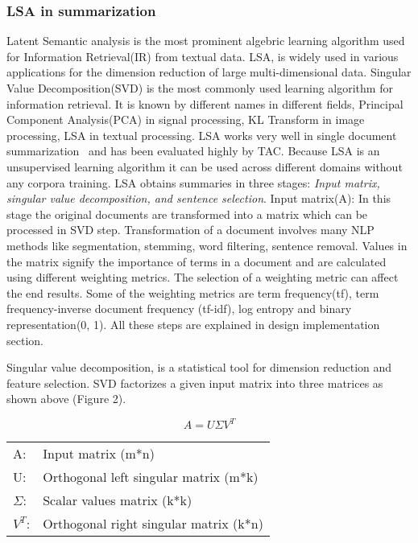 \subsubsection{LSA in summarization}
Latent Semantic analysis is the most prominent algebric learning algorithm used for Information Retrieval(IR) from textual data. LSA, is widely used
in various applications for the dimension reduction of large multi-dimensional data. Singular Value Decomposition(SVD) is the most
commonly used learning algorithm for information retrieval. It is known by different names in different fields, Principal Component
Analysis(PCA) in signal processing, KL Transform in image processing, LSA in textual processing. LSA works very well in
single document summarization~\cite{Steinberger:2009} and has been evaluated highly by TAC. Because LSA is an unsupervised
learning algorithm it can be used across different domains without any corpora training. LSA obtains summaries in three
stages: \textit{Input matrix, singular value decomposition, and sentence selection}. \newline
Input matrix(A): In this stage the original documents are transformed into a matrix which can be processed in SVD step. Transformation
of a document involves many NLP methods like segmentation, stemming, word filtering, sentence removal. Values in the matrix signify
the importance of terms in a document and are calculated using different weighting metrics. The selection of a weighting metric can affect
the end results. Some of the weighting metrics are term frequency(tf), term frequency-inverse document frequency (tf-idf), 
log entropy and binary representation(0, 1). All these steps are explained in design implementation section.\newline

Singular value decomposition, is a statistical tool for dimension reduction and feature selection. SVD factorizes a given input
matrix into three matrices as shown above (Figure 2).\newline

\begin{equation}
 A  = U \Sigma V^T
\end{equation}
\begin{center}
\begin{tabular}{ll}
A:&Input matrix (m*n)\\
U:& Orthogonal left singular matrix (m*k)\\
$\Sigma$:& Scalar values matrix (k*k)\\
$V^T$:& Orthogonal right singular matrix (k*n)\\
\end{tabular}
\end{center}

